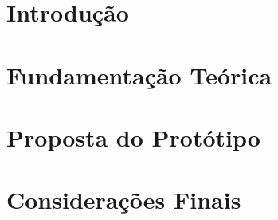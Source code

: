 \documentclass[
	12pt,	
    oneside,
    a4paper,
    brazil  
]{abntex2}
\begin{document}
\newpage
\begin{abstract}
Technology professionals often need to move the same rule from one representation to another, such as from a spreadsheet formula to code. When a formula has nested conditions, the logic is hidden and it is easy to miss a condition. This work proposes a prototype that converts spreadsheet formulas with nested conditions into Python code and shows the logic as a flowchart. The formula's logic is organized as a tree of conditions, from which the code and the flowchart are generated. The evaluation compares the formula's result with the code's result on test cases and collects a professional's opinion on the usefulness of the flowchart. The work is in progress: the problem, the proposal and the evaluation plan are defined, and the prototype development is the next step.

\vspace*{20pt}
\textbf{Keywords:} computational logic; spreadsheet formulas; code conversion; flowchart; Python.
\end{abstract}


\newpage
\listoffigures*




\tableofcontents*

 
\textual 
\chapter{Introdução}


\chapter{Fundamentação Teórica}



\chapter{Proposta do Protótipo}


\chapter{Considerações Finais}

    


\end{document}
